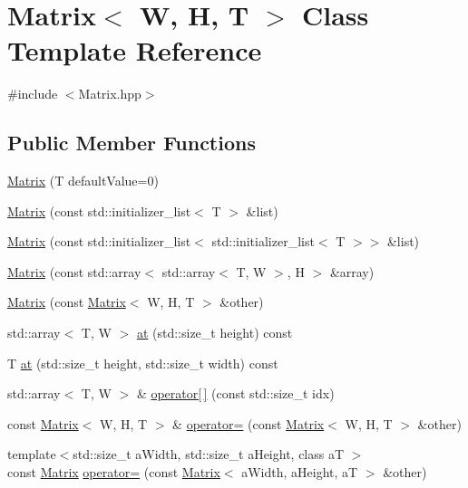 \hypertarget{class_matrix}{}\section{Matrix$<$ W, H, T $>$ Class Template Reference}
\label{class_matrix}


{\ttfamily \#include $<$Matrix.\+hpp$>$}

\subsection*{Public Member Functions}
\begin{DoxyCompactItemize}
\item 
\hyperlink{class_matrix_a26e9ec6ddcde3891596c76e8fd753d04}{Matrix} (T default\+Value=0)
\item 
\hyperlink{class_matrix_a304fa7436faff40983551ed2d93b8583}{Matrix} (const std\+::initializer\+\_\+list$<$ T $>$ \&list)
\item 
\hyperlink{class_matrix_a266627bf345d07baa56e78c25013a83d}{Matrix} (const std\+::initializer\+\_\+list$<$ std\+::initializer\+\_\+list$<$ T $>$$>$ \&list)
\item 
\hyperlink{class_matrix_a94c464f26c4f31ff40674a2432ed9c6e}{Matrix} (const std\+::array$<$ std\+::array$<$ T, W $>$, H $>$ \&array)
\item 
\hyperlink{class_matrix_ad8895ac9cc7fc537addf48c1fb9497b9}{Matrix} (const \hyperlink{class_matrix}{Matrix}$<$ W, H, T $>$ \&other)
\item 
std\+::array$<$ T, W $>$ \hyperlink{class_matrix_ab33ffea8cb7e14c82d7ac183a9929198}{at} (std\+::size\+\_\+t height) const 
\item 
T \hyperlink{class_matrix_a9454a436ff7c18983b832642cc58b3ff}{at} (std\+::size\+\_\+t height, std\+::size\+\_\+t width) const 
\item 
std\+::array$<$ T, W $>$ \& \hyperlink{class_matrix_a5c110971f6c4b6282b937d0e815ab731}{operator\mbox{[}$\,$\mbox{]}} (const std\+::size\+\_\+t idx)
\item 
const \hyperlink{class_matrix}{Matrix}$<$ W, H, T $>$ \& \hyperlink{class_matrix_a20c1001ca220100453e36b15279b6ab7}{operator=} (const \hyperlink{class_matrix}{Matrix}$<$ W, H, T $>$ \&other)
\item 
{\footnotesize template$<$std\+::size\+\_\+t a\+Width, std\+::size\+\_\+t a\+Height, class aT $>$ }\\const \hyperlink{class_matrix}{Matrix} \hyperlink{class_matrix_a1b74e614af59905c38d68eb0daaffec7}{operator=} (const \hyperlink{class_matrix}{Matrix}$<$ a\+Width, a\+Height, aT $>$ \&other)
$$
\end{DoxyCompactItemize}
